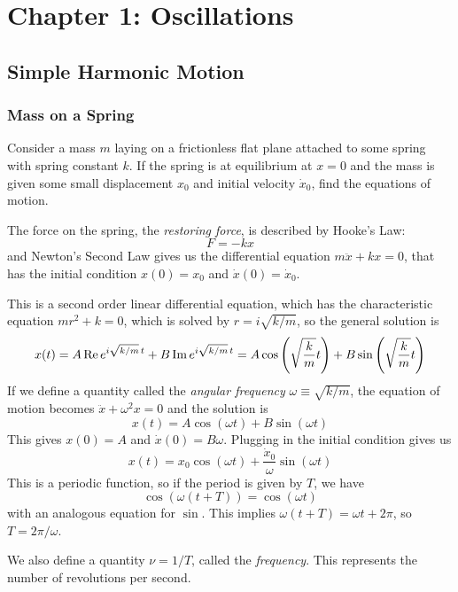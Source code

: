 \chapter{Chapter 1: Oscillations}
\section{Simple Harmonic Motion}
\subsection*{Mass on a Spring}
Consider a mass $m$ laying on a frictionless flat plane attached to some spring with spring constant $k$. If the spring is at equilibrium at $x=0$ and the mass is given some small displacement $x_0$ and initial velocity $\dot x_0$, find the equations of motion.

The force on the spring, the \textit{restoring force}, is described by Hooke's Law:
\[ F = -kx \]
and Newton's Second Law gives us the differential equation $m\ddot x + kx = 0$, that has the initial condition $x(0) = x_0$ and $\dot x(0) = \dot x_0$.

This is a second order linear differential equation, which has the characteristic equation $mr^2 + k = 0$, which is solved by $r = i\sqrt{k/m}$, so the general solution is
\[ x(t) = A\Re e^{i\sqrt{k/m}\, t} + B\Im e^{i\sqrt{k/m}\, t} = A\cos\pqty{\sqrt{\frac{k}{m}}t} + B\sin\pqty{\sqrt{\frac{k}{m}}t}\]
If we define a quantity called the \textit{angular frequency} $\omega\equiv \sqrt{k/m}$, the equation of motion becomes $\ddot x + \omega^2 x = 0$ and the solution is
\[ x(t) = A\cos(\omega t) + B\sin(\omega t) \]
This gives $x(0) = A$ and $\dot x(0) = B\omega$. Plugging in the initial condition gives us
\begin{equation}\label{superpos}
    x(t) = x_0\cos(\omega t) + \frac{\dot x_0}{\omega }\sin(\omega t)
\end{equation}
This is a periodic function, so if the period is given by $T$, we have
\[ \cos(\omega(t + T)) = \cos(\omega t) \]
with an analogous equation for $\sin$. This implies $\omega (t + T) = \omega t + 2\pi$, so $T = 2\pi/\omega$.

We also define a quantity $\nu = 1/T$, called the \textit{frequency}. This represents the number of revolutions per second.

